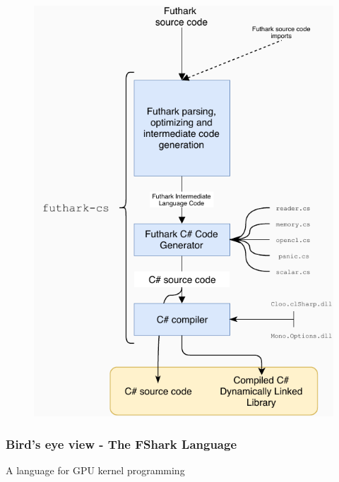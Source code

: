 \documentclass[10pt, compress, usenames, dvipsnames]{beamer}
\begin{document}
\begin{frame}[fragile]
\begin{figure}
\begin{overprint}
        \includegraphics[scale=0.6]{./images/futharkcsarchitecture.pdf}
      \end{overprint}
    \end{figure}

\end{frame}

\begin{frame}[plain,c]
  \frametitle{Bird's eye view - The FShark Language}
  \begin{center}
    \Huge A language for GPU kernel programming
  \end{center}
\end{frame}
\end{document}
